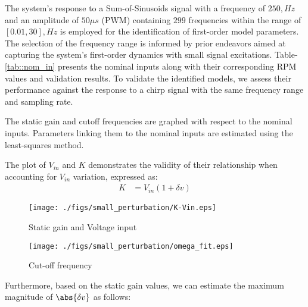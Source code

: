 The system's response to a Sum-of-Sinusoids signal with a frequency of $250 ,
Hz$ and an amplitude of $50 \mu s$ (PWM) containing $299$ frequencies within
the range of $[0.01, 30],Hz$ is employed for the identification of first-order
model parameters. The selection of the frequency range is informed by prior
endeavors aimed at capturing the system's first-order dynamics with small
signal excitations\cite{charla2022enhancing}. Table-\ref{tab::nom_in} presents
the nominal inputs along with their corresponding RPM values and validation
results. To validate the identified models, we assess their performance against
the response to a chirp signal with the same frequency range and sampling rate.

The static gain and cutoff frequencies are graphed with respect to the nominal inputs. Parameters linking them to the nominal inputs are estimated using the least-squares method.

The plot of $V_{in}$ and $K$ demonstrates the validity of their relationship when accounting for $V_{in}$ variation, expressed as:
\begin{align}
    K &= V_{in} (1 + \delta v)
\end{align}
\begin{figure}[h]
    \centering
    \texttt{[image: ./figs/small\_perturbation/K-Vin.eps]}
    \caption{Static gain and Voltage input}
\end{figure}
\begin{figure}[h]
    \centering
    \texttt{[image: ./figs/small\_perturbation/omega\_fit.eps]}
    \caption{Cut-off frequency}
\end{figure}
Furthermore, based on the static gain values, we can estimate the maximum magnitude of $\abs{\delta v}$ as follows:
